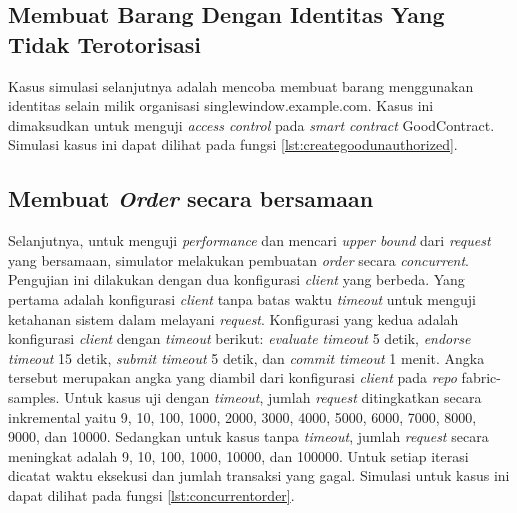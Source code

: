 






\subsection{Membuat Barang Dengan Identitas Yang Tidak Terotorisasi}
Kasus simulasi selanjutnya adalah mencoba membuat barang menggunakan identitas selain milik organisasi singlewindow.example.com. Kasus ini dimaksudkan untuk menguji \textit{access control} pada \textit{smart contract} GoodContract. Simulasi kasus ini dapat dilihat pada fungsi \ref{lst:creategoodunauthorized}.



\subsection{Membuat \textit{Order} secara bersamaan}
Selanjutnya, untuk menguji \textit{performance} dan mencari \textit{upper bound} dari \textit{request} yang bersamaan, simulator melakukan pembuatan \textit{order} secara \textit{concurrent}. Pengujian ini dilakukan dengan dua konfigurasi \textit{client} yang berbeda. Yang pertama adalah konfigurasi \textit{client} tanpa batas waktu \textit{timeout} untuk menguji ketahanan sistem dalam melayani \textit{request}. Konfigurasi yang kedua adalah konfigurasi \textit{client} dengan \textit{timeout} berikut: \textit{evaluate timeout} 5 detik, \textit{endorse timeout} 15 detik, \textit{submit timeout} 5 detik, dan \textit{commit timeout} 1 menit. Angka tersebut merupakan angka yang diambil dari konfigurasi \textit{client} pada \textit{repo} fabric-samples. Untuk kasus uji dengan \textit{timeout}, jumlah \textit{request} ditingkatkan secara inkremental yaitu 9, 10, 100, 1000, 2000, 3000, 4000, 5000, 6000, 7000, 8000, 9000, dan 10000. Sedangkan untuk kasus tanpa \textit{timeout}, jumlah \textit{request} secara meningkat adalah 9, 10, 100, 1000, 10000, dan 100000. Untuk setiap iterasi dicatat waktu eksekusi dan jumlah transaksi yang gagal. Simulasi untuk kasus ini dapat dilihat pada fungsi \ref{lst:concurrentorder}.








